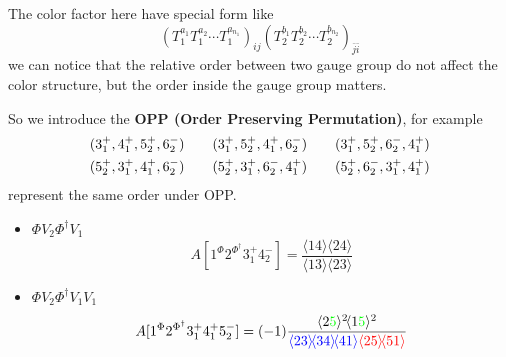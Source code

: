 \documentclass{beamer}
\newcommand{\avg}[1]{\langle #1 \rangle}
\newcommand{\mdavg}[2]{\langle #1 \rangle\!\langle #2 \rangle}
\begin{document}
\begin{frame}
\begin{center}
\begin{tikzpicture}[x=0.75pt,y=0.75pt,yscale=0.8,xscale=0.8]
        \end{tikzpicture}
    \end{center}
    The color factor here have special form like
    \begin{equation*}
         (T_1^{a_1}T_1^{a_2}\cdots T_1^{a_{n_1}})_{ij}(T_2^{b_1}T_2^{b_2}\cdots T_2^{b_{n_2}})_{\bar{j}\bar{i}}
    \end{equation*}
     we can notice that the relative order between two gauge group do not affect the color structure, but the
    order inside the gauge group matters.
\end{frame}

\begin{frame}
    So we introduce the \textbf{OPP (Order Preserving Permutation)}, for example 
    \begin{gather*}
        (3_1^+,4_1^+,5_2^+,6_2^-)\qquad(3_1^+,5_2^+,4_1^+,6_2^-)\qquad (3_1^+,5_2^+,6_2^-,4_1^+)\notag\\
        (5_2^+,3_1^+,4_1^+,6_2^-)\qquad(5_2^+,3_1^+,6_2^-,4_1^+)\qquad (5_2^+,6_2^-,3_1^+,4_1^+)
    \end{gather*}
    represent the same order under OPP.
    \begin{itemize}
        \item $\Phi V_2 \Phi^\dagger V_1$
        \begin{equation*}
            A[1^\Phi2^{\Phi^\dagger}3_1^+4_2^-]=\frac{\mdavg{14}{24}}{\mdavg{13}{23}}
        \end{equation*}
        \item $\Phi V_2 \Phi^\dagger V_1V_1$
        \begin{equation*}
            A[1^\Phi2^{\Phi^\dagger}3_1^+4_1^+5_2^-]=(-1)\frac{\avg{2\textcolor{green}{5}}^2\!\avg{1\textcolor{green}{5}}^2}{\textcolor{blue}{\mdavg{23}{34}\!\avg{41}}\textcolor{red}{\mdavg{25}{51}}}
        \end{equation*}  
    \end{itemize}
\end{frame}
\end{document}
